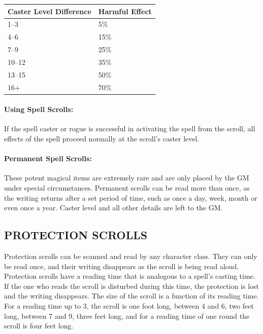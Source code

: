 \begin{multicols}{2}
\noindent
\begin{minipage}{\columnwidth}

\label{spellfailure}
\noindent
\begin{tabular}{|p{}|p{}|}
\hline
Caster Level Difference	& Harmful Effect \\
\hline\hline
\rowcolor[gray]{.9}1--3	& 5\% \\
4--6	& 15\% \\
\rowcolor[gray]{.9}7--9	& 25\% \\
10--12	& 35\% \\
\rowcolor[gray]{.9}13--15	& 50\% \\
16+	& 70\% \\
\hline
\end{tabular}

\end{minipage}

\paragraph{Using Spell Scrolls:} If the spell caster or rogue is successful in activating the spell from the scroll, all effects of the spell proceed normally at the scroll's caster level.

\paragraph{Permanent Spell Scrolls:} These potent magical items are extremely rare and are only placed by the GM under special circumstances.  Permanent scrolls can be read more than once, as the writing returns after a set period of time, such as once a day, week, month or even once a year.  Caster level and all other details are left to the GM.

\subsection{PROTECTION SCROLLS}

Protection scrolls can be scanned and read by any character class.  They can only be read once, and their writing disappears as the scroll is being read aloud.  Protection scrolls have a reading time that is analogous to a spell's casting time.  If the one who reads the scroll is disturbed during this time, the protection is lost and the writing disappears.  The size of the scroll is a function of its reading time.  For a reading time up to 3, the scroll is one foot long, between 4 and 6, two feet long, between 7 and 9, three feet long, and for a reading time of one round the scroll is four feet long. 


\end{multicols}
